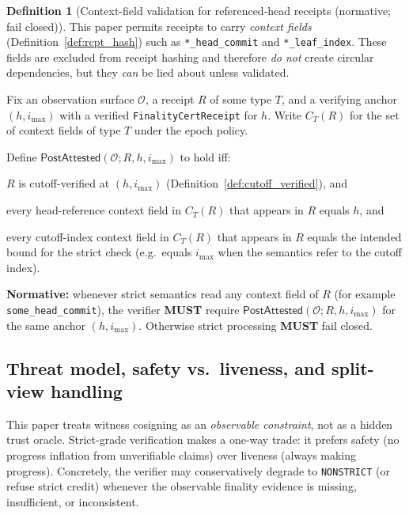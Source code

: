 \documentclass[11pt]{article}
\newcommand{\MUST}{\textbf{MUST}}
\newcommand{\code}[1]{\texttt{#1}}
\newcommand{\1}{\mathbf{1}}
\theoremstyle{definition}
\newtheorem{definition}{Definition}
\theoremstyle{plain}
\begin{document}
\begin{definition}[Context-field validation for referenced-head receipts (normative; fail closed)]
\label{def:post_attest}
This paper permits receipts to carry \emph{context fields} (Definition~\ref{def:rcpt_hash}) such as \code{*\_head\_commit} and \code{*\_leaf\_index}. These fields are excluded from receipt hashing and therefore \emph{do not} create circular dependencies, but they \emph{can} be lied about unless validated.

Fix an observation surface $\mathcal{O}$, a receipt $R$ of some type $T$, and a verifying anchor $(h,i_{\max})$ with a verified \code{FinalityCertReceipt} for $h$.
Write $C_T(R)$ for the set of context fields of type $T$ under the epoch policy.

Define $\mathsf{PostAttested}(\mathcal{O};R,h,i_{\max})$ to hold iff:
\begin{tightitemize}
\item[(i)] $R$ is cutoff-verified at $(h,i_{\max})$ (Definition~\ref{def:cutoff_verified}), and
\item[(ii)] every head-reference context field in $C_T(R)$ that appears in $R$ equals $h$, and
\item[(iii)] every cutoff-index context field in $C_T(R)$ that appears in $R$ equals the intended bound for the strict check (e.g.\ equals $i_{\max}$ when the semantics refer to the cutoff index).
\end{tightitemize}

\textbf{Normative:} whenever strict semantics read any context field of $R$ (for example \code{some\_head\_commit}), the verifier \MUST{} require $\mathsf{PostAttested}(\mathcal{O};R,h,i_{\max})$ for the same anchor $(h,i_{\max})$. Otherwise strict processing \MUST{} fail closed.
\end{definition}



\subsection{Threat model, safety vs.\ liveness, and split-view handling}
\label{sec:threat}

This paper treats witness cosigning as an \emph{observable constraint}, not as a hidden trust oracle. Strict-grade verification makes a one-way trade: it prefers safety (no progress inflation from unverifiable claims) over liveness (always making progress). Concretely, the verifier may conservatively degrade to \texttt{NONSTRICT} (or refuse strict credit) whenever the observable finality evidence is missing, insufficient, or inconsistent.
\end{document}
